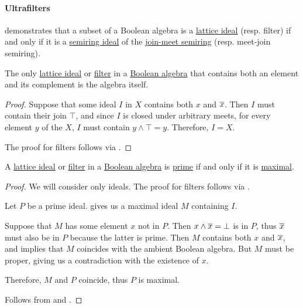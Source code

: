 \paragraph{Ultrafilters}

\begin{remark}\label{rem:boolean_algebra_ideal}
   demonstrates that a subset of a Boolean algebra is a \hyperref[def:lattice_ideal]{lattice ideal} (resp. filter) if and only if it is a \hyperref[def:semiring_ideal]{semiring ideal} of the \hyperref[ex:def:semiring/lattice]{join-meet semiring} (resp. meet-join semiring).
\end{remark}

\begin{proposition}\label{thm:improper_boolean_ideal}
  The only \hyperref[def:lattice_ideal]{lattice ideal} or \hyperref[def:lattice_ideal]{filter} in a \hyperref[def:boolean_algebra]{Boolean algebra} that contains both an element and its complement is the algebra itself.
\end{proposition}
\begin{proof}
  Suppose that some ideal \( I \) in \( X \) contains both \( x \) and \( \oline x \). Then \( I \) must contain their join \( \top \), and since \( I \) is closed under arbitrary meets, for every element \( y \) of the \( X \), \( I \) must contain \( y \wedge \top = y \). Therefore, \( I = X \).

  The proof for filters follows via .
\end{proof}

\begin{proposition}\label{thm:boolean_prime_iff_maximal}
  A \hyperref[def:lattice_ideal]{lattice ideal} or \hyperref[def:lattice_ideal]{filter} in a \hyperref[def:boolean_algebra]{Boolean algebra} is \hyperref[def:lattice_ideal/prime]{prime} if and only if it is \hyperref[def:lattice_ideal/maximal]{maximal}.
\end{proposition}
\begin{proof}
  We will consider only ideals. The proof for filters follows via .

  \SufficiencySubProof Let \( P \) be a prime ideal.  gives us a maximal ideal \( M \) containing \( I \).

  Suppose that \( M \) has some element \( x \) not in \( P \). Then \( x \wedge \oline x = \bot \) is in \( P \), thus \( \oline x \) must also be in \( P \) because the latter is prime. Then \( M \) contains both \( x \) and \( \oline x \), and  implies that \( M \) coincides with the ambient Boolean algebra. But \( M \) must be proper, giving us a contradiction with the existence of \( x \).

  Therefore, \( M \) and \( P \) coincide, thus \( P \) is maximal.

  \NecessitySubProof Follows from  and .
\end{proof}

